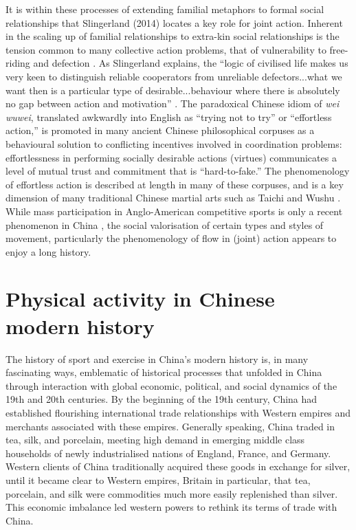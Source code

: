   It is within these processes of extending familial metaphors to formal social relationships that Slingerland (2014) locates a key role for joint action. Inherent in the scaling up of familial relationships to extra-kin social relationships is the tension common to many collective action problems, that of vulnerability to free-riding and defection \citep{Cosmides2013,Gavrilets2015}.
  As Slingerland explains, the ``logic of civilised life makes us very keen to distinguish reliable cooperators from unreliable defectors...what we want then is a particular type of desirable...behaviour where there is absolutely no gap between action and motivation'' \citep[192]{Slingerland2014}. The paradoxical Chinese idiom of \textit{wei wuwei}, translated awkwardly into English as ``trying not to try'' or ``effortless action,'' is promoted in many ancient Chinese philosophical corpuses as a behavioural solution to conflicting incentives involved in coordination problems: effortlessness in performing socially desirable actions (virtues) communicates a level of mutual trust and commitment that is ``hard-to-fake.''  The phenomenology of effortless action is described at length in many of these corpuses, and is a key dimension of many traditional Chinese martial arts such as Taichi and Wushu \citep{Morris1998}.
  While mass participation in Anglo-American competitive sports is only a recent phenomenon in China \citep{Brownell2008}, the social valorisation of certain types and styles of movement, particularly the phenomenology of flow in (joint) action appears to enjoy a long history.

  \section{Physical activity in Chinese modern history}
  The history of sport and exercise in China's modern history is, in many fascinating ways, emblematic of historical processes that unfolded in China through interaction with global economic, political, and social dynamics of the 19th and 20th centuries.  By the beginning of the 19th century, China had established flourishing international trade relationships with Western empires and merchants associated with these empires.  Generally speaking, China traded in tea, silk, and porcelain, meeting high demand in emerging middle class households of newly industrialised nations of England, France, and Germany.  Western clients of China traditionally acquired these goods in exchange for silver, until it became clear to Western empires, Britain in particular, that tea, porcelain, and silk were commodities much more easily replenished than silver. This economic imbalance led western powers to rethink its terms of trade with China.

